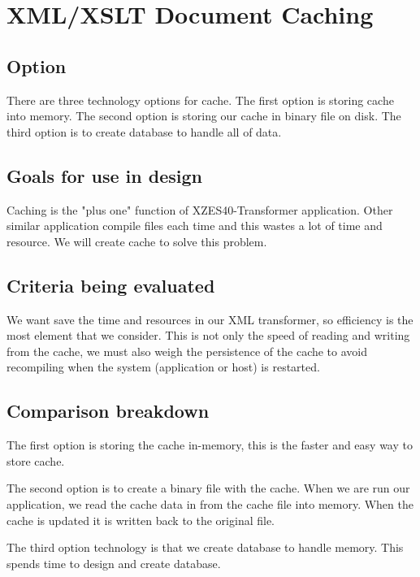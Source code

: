 \section{XML/XSLT Document Caching}

\subsection{Option}

There are three technology options for cache.
The first option is storing cache into memory.
The second option is storing our cache in binary file on disk.
The third option is to create database to handle all of data.

\subsection{Goals for use in design}

Caching is the "plus one" function of XZES40-Transformer application.
Other similar application compile files each time and this wastes a lot of time and resource.
We will create cache to solve this problem. 

\subsection{Criteria being evaluated}

We want save the time and resources in our XML transformer, so efficiency is the most element that we consider.
This is not only the speed of reading and writing from the cache, we must also weigh the persistence of the cache to avoid recompiling when the system (application or host) is restarted.

\subsection{Comparison breakdown}

The first option is storing the cache in-memory, this is the faster and easy way to store cache.

The second option is to create a binary file with the cache.
When we are run our application, we read the cache data in from the cache file into memory.
When the cache is updated it is written back to the original file.

The third option technology is that we create database to handle memory.
This spends time to design and create database.

